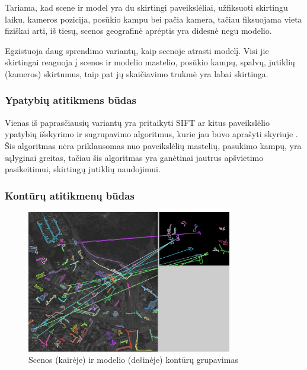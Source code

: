 \documentclass[a4paper,12pt]{article}
\begin{document}
		Tariama, kad \gls{scene} ir \gls{model} yra du skirtingi paveikslėliai, užfiksuoti skirtingu laiku, kameros pozicija, posūkio kampu bei pačia kamera, tačiau fiksuojama vieta fiziškai arti, iš tiesų, scenos geografinė aprėptis yra didesnė negu modelio.
	
		Egzistuoja daug sprendimo variantų, kaip scenoje atrasti modelį. Visi jie skirtingai reaguoja į scenos ir modelio mastelio, posūkio kampų, spalvų, jutiklių (kameros) skirtumus, taip pat jų skaičiavimo trukmė yra labai skirtinga.
				
	\subsubsection{Ypatybių atitikmens būdas}
		
		Vienas iš paprasčiausių variantų yra pritaikyti SIFT ar kitus paveikslėlio ypatybių išskyrimo ir sugrupavimo algoritmus, kurie jau buvo aprašyti skyriuje . Šis algoritmas nėra priklausomas nuo paveikslėlių mastelių, pasukimo kampų, yra sąlyginai greitas, tačiau šis algoritmas yra ganėtinai jautrus apšvietimo pasikeitimui, skirtingų jutiklių naudojimui.
		
	\subsubsection{Kontūrų atitikmenų būdas}
		
		\begin{figure}[h]
			\centering
			\includegraphics[width=0.8\textwidth]{images/ContourMatches.png}
			\caption{Scenos (kairėje) ir modelio (dešinėje) kontūrų grupavimas}
			\label{fig:ContourMatching}
		\end{figure}
		
\end{document}
